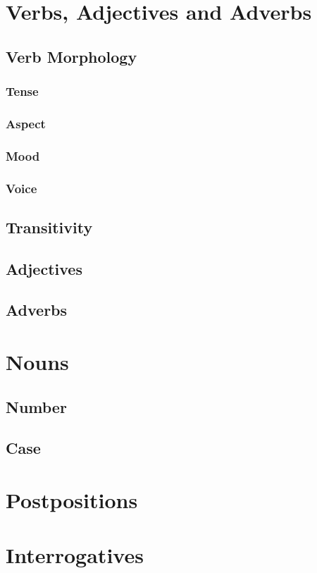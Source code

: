 \documentclass[11pt,a4paper,titlepage]{article}
\begin{document}
	\section{Verbs, Adjectives and Adverbs}
		\lipsum[1]
		\subsection{Verb Morphology}
			\lipsum[1]
			\subsubsection{Tense}
				\lipsum[1]
			\subsubsection{Aspect}
				\lipsum[1]
			\subsubsection{Mood}
				\lipsum[1]
			\subsubsection{Voice}
				\lipsum[1]
		\subsection{Transitivity}
			\lipsum[1]
		\subsection{Adjectives}
			\lipsum[1]
		\subsection{Adverbs}
			\lipsum[1]
	\section{Nouns}
		\lipsum[1]
		\subsection{Number}
			\lipsum[1]
		\subsection{Case}
			\lipsum[1]
	\section{Postpositions}
		\lipsum[1]
	\section{Interrogatives}
		\lipsum[1]
\end{document}
